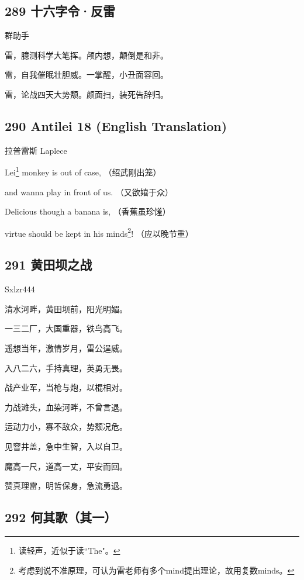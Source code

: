 \hypertarget{ux5341ux516dux5b57ux4ee4ux53cdux96f7-1}{%
\subsection{289
十六字令·反雷}\label{ux5341ux516dux5b57ux4ee4ux53cdux96f7-1}}

{群助手}

雷，臆测科学大笔挥。颅内想，颠倒是和非。

雷，自我催眠壮胆威。一掌醒，小丑面容回。

雷，论战四天大势颓。颜面扫，装死告辞归。

\hypertarget{antilei-18-english-translation}{%
\subsection{290 Antilei 18 (English
Translation)}\label{antilei-18-english-translation}}

{拉普雷斯 Laplece}

Lei\footnote{读轻声，近似于读``The"。} monkey is out of case,
（绍武刚出笼）

and wanna play in front of us. （又欲嬉于众）

Delicious though a banana is, （香蕉虽珍馐）

virtue should be kept in his minds\footnote{考虑到说不准原理，可认为雷老师有多个mind提出理论，故用复数minds。}!
（应以晚节重）

\hypertarget{ux9ec4ux7530ux575dux4e4bux6218}{%
\subsection{291 黄田坝之战}\label{ux9ec4ux7530ux575dux4e4bux6218}}

{Sxlzr444}

清水河畔，黄田坝前，阳光明媚。

一三二厂，大国重器，铁鸟高飞。

遥想当年，激情岁月，雷公逞威。

入八二六，手持真理，英勇无畏。

战产业军，当枪与炮，以棍相对。

力战滩头，血染河畔，不曾言退。

运动力小，寡不敌众，势颓况危。

见窨井盖，急中生智，入以自卫。

魔高一尺，道高一丈，平安而回。

赞真理雷，明哲保身，急流勇退。

\hypertarget{ux4f55ux5176ux6b4cux5176ux4e00}{%
\subsection{292 何其歌（其一）}\label{ux4f55ux5176ux6b4cux5176ux4e00}}

